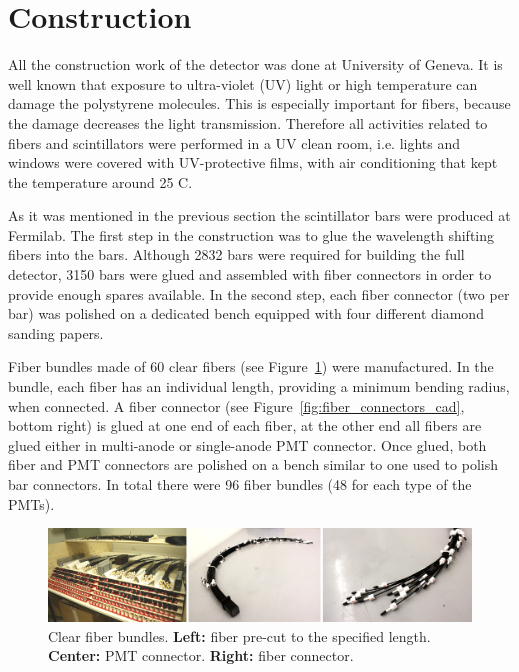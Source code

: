 \documentclass[a4paper,11pt]{article}
\begin{document}
\section{Construction}\label{sec:construction}

All the construction work of the detector was done at University of Geneva. It is well known that exposure to ultra-violet (UV) light or high temperature can
damage the polystyrene molecules. This is especially important for fibers, because the damage decreases the light transmission. Therefore all activities
related to fibers and scintillators were performed in a UV clean room, i.e. lights and windows were covered with UV-protective films, with air conditioning
that kept the temperature around 25 \degree C. 

As it was mentioned in the previous section the scintillator bars were produced at Fermilab. The first step in the construction was to glue the wavelength shifting
fibers into the bars. Although 2832 bars were required for building the full detector, 3150 bars were glued and assembled with fiber connectors in order to provide
enough spares available. In the second step, each fiber connector (two per bar) was polished on a dedicated bench equipped with four different diamond sanding papers. 

Fiber bundles made of 60 clear fibers (see Figure~\ref{fig:fiber_bundles}) were manufactured. In the bundle, each fiber has an
individual length, providing a minimum bending radius, when connected. A fiber connector (see Figure~\ref{fig:fiber_connectors_cad}, bottom right)
is glued at one end of each fiber, at the other end all fibers are glued either in multi-anode or single-anode PMT connector. Once glued, both fiber and PMT connectors
are polished on a bench similar to one used to polish bar connectors. In total there were 96 fiber bundles (48 for each type of the PMTs).

\begin{figure}[htp!]
 \centering
 \includegraphics[width=\textwidth]{./fiber_bundles}
 \caption[Clear fiber bundles]{Clear fiber bundles. {\bf Left:} fiber pre-cut to the specified length. {\bf Center:} PMT connector. {\bf Right:} fiber connector.}
 \label{fig:fiber_bundles}
\end{figure}
\end{document}
